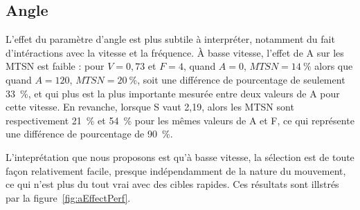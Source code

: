 	\subsection{Angle}
	L'effet du paramètre d'angle est plus subtile à interpréter, notamment du fait d'intéractions avec la vitesse et la fréquence. À basse vitesse, l'effet de A sur les MTSN est faible : pour $V = 0,73$ et $F = 4$, quand $A= 0$, $MTSN = 14~\%{}$ alors que quand $A = 120$, $MTSN = 20~\%{}$, soit une différence de pourcentage de seulement 33~\%{}, et qui plus est la plus importante mesurée entre deux valeurs de A pour cette vitesse. En revanche, lorsque S vaut 2,19, alors les MTSN sont respectivement 21~\%{} et 54~\%{} pour les mêmes valeurs de A et F, ce qui représente une différence de pourcentage de 90~\%{}.
	
	L'inteprétation que nous proposons est qu'à basse vitesse, la sélection est de toute façon relativement facile, presque indépendamment de la nature du mouvement, ce qui n'est plus du tout vrai avec des cibles rapides. Ces résultats sont illstrés par la figure~\ref{fig:aEffectPerf}.


